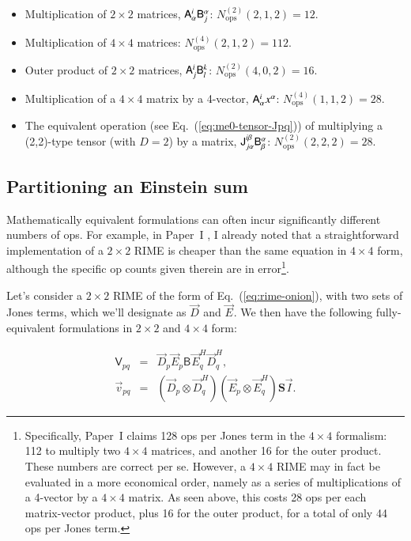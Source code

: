 \documentclass[]{aa}
\newcommand{\herm}{H}
\newcommand{\jones}[2]{\vec {#1}_{#2}}
\newcommand{\jonesT}[2]{\vec {#1}^{\herm}_{#2}}
\newcommand{\coh}[2]{\mathsf{{#1}}_{{#2}}}
\begin{document}
\begin{itemize}
\item Multiplication of $2\times2$ matrices, $\mathsf{A}^i_\alpha\mathsf{B}^\alpha_j$: $N_\mathrm{ops}^{(2)}(2,1,2)=12$.
\item Multiplication of $4\times4$ matrices: $N_\mathrm{ops}^{(4)}(2,1,2)=112$.
\item Outer product of $2\times2$ matrices, $\mathsf{A}^i_j\mathsf{B}^k_l$:  $N_\mathrm{ops}^{(2)}(4,0,2)=16$.
\item Multiplication of a $4\times4$ matrix by a 4-vector, $\mathsf{A}^i_\alpha x^\alpha$:  $N_\mathrm{ops}^{(4)}(1,1,2)=28$.
\item The equivalent operation (see Eq.~(\ref{eq:me0-tensor-Jpq})) of multiplying a (2,2)-type tensor (with $D=2$) by a matrix, 
$\mathsf{J}^{i\beta}_{j\alpha}\mathsf{B}^\alpha_\beta$: $N_\mathrm{ops}^{(2)}(2,2,2)=28$.

\end{itemize}

\subsection{Partitioning an Einstein sum}

Mathematically equivalent formulations can often incur significantly different numbers of ops. For example, in Paper~I \citep[Sect.~6.1]{RRIME1}, I already noted that a straightforward implementation of a $2\times2$ RIME is cheaper than the same equation in $4\times4$ form, although the specific op counts given therein are in error\footnote{Specifically, Paper~I claims 128 ops per Jones term in the $4\times4$ formalism: 112 to multiply two $4\times4$ matrices, and another 16 for the outer product. These numbers are correct per se. However, a $4\times4$ RIME may in fact be evaluated in a more economical order, namely as a series of multiplications of a 4-vector by a $4\times4$ matrix. As seen above, this costs 28 ops per each matrix-vector product, plus 16 for the outer product, for a total of only 44 ops per Jones term.}.

Let's consider a $2\times2$ RIME of the form of Eq.~(\ref{eq:rime-onion}), with two sets of Jones terms, which we'll designate as $\jones{D}{}$ and $\jones{E}{}$. We then have the following fully-equivalent formulations in $2\times2$ and $4\times4$ form:

\begin{eqnarray}
\label{eq:example-2x2}
  \coh{V}{pq} &=& \jones{D}{p}\jones{E}{p} \coh{B}{} \jonesT{E}{q} \jonesT{D}{q}, \\
\label{eq:example-4x4}
  \vec v_{pq} &=& (\jones{D}{p}\otimes\jonesT{D}{q})(\jones{E}{p}\otimes\jonesT{E}{q})
              \mathbf{S}{} \vec I.
\end{eqnarray}
\end{document}
